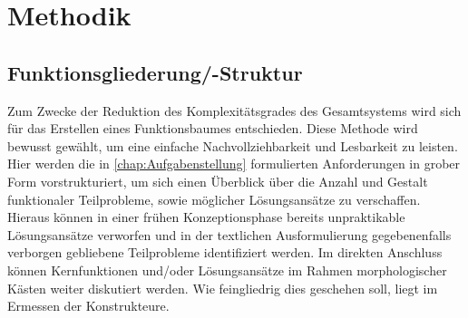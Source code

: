 \chapter{Methodik}
	\section{Funktionsgliederung/-Struktur}
		Zum Zwecke der Reduktion des Komplexitätsgrades des Gesamtsystems wird sich für das Erstellen eines Funktionsbaumes entschieden. Diese Methode wird bewusst gewählt, um eine einfache Nachvollziehbarkeit und Lesbarkeit zu leisten.\\
		Hier werden die in \cref{chap:Aufgabenstellung} formulierten Anforderungen in grober Form vorstrukturiert, um sich einen Überblick über die Anzahl und Gestalt funktionaler Teilprobleme, sowie möglicher Lösungsansätze zu verschaffen.\\
		Hieraus können in einer frühen Konzeptionsphase bereits unpraktikable Lösungsansätze verworfen und in der textlichen Ausformulierung gegebenenfalls verborgen gebliebene Teilprobleme identifiziert werden.
		Im direkten Anschluss können Kernfunktionen und/oder Lösungsansätze im Rahmen morphologischer Kästen weiter diskutiert werden.	Wie feingliedrig dies geschehen soll, liegt im Ermessen der Konstrukteure.

